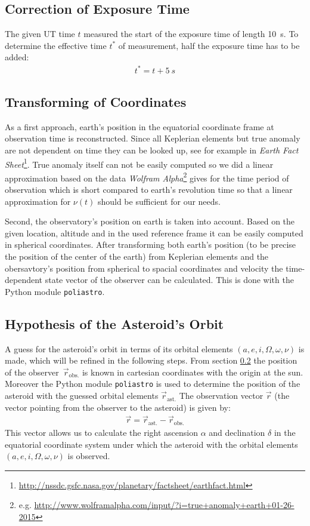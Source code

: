 \documentclass[11pt, a4paper]{article}
\numberwithin{equation}{section}
\begin{document}
\subsection{Correction of Exposure Time}
The given UT time $t$ measured the start of the exposure time of length \SI{10}{s}.
To determine the effective time $t^*$ of measurement, half the exposure time has to be added:
\begin{align}
	t^* = t + \SI{5}{s}
\end{align}

\subsection{Transforming of Coordinates}
\label{sec:cstransform}
As a first approach, earth's position in the equatorial coordinate frame at observation time is reconstructed.
Since all Keplerian elements but true anomaly are not dependent on time they can be looked up, see for example in \emph{Earth Fact Sheet}\footnote{\url{http://nssdc.gsfc.nasa.gov/planetary/factsheet/earthfact.html}}.
True anomaly itself can not be easily computed so we did a linear approximation based on the data \emph{Wolfram Alpha}\footnote{e.g. \url{http://www.wolframalpha.com/input/?i=true+anomaly+earth+01-26-2015}} gives for the time period of observation which is short compared to earth's revolution time so that a linear approximation for $\nu(t)$ should be sufficient for our needs.

Second, the observatory's position on earth is taken into account.
Based on the given location, altitude and in the used reference frame it can be easily computed in spherical coordinates.
After transforming both earth's position (to be precise the position of the center of the earth) from Keplerian elements and the obersavtory's position from spherical to spacial coordinates and velocity the time-dependent state vector of the observer can be calculated.
This is done with the Python module \texttt{poliastro}.

\subsection{Hypothesis of the Asteroid's Orbit}
\label{sec:hypothesis}
A guess for the asteroid's orbit in terms of its orbital elements $(a, e, i, \Omega, \omega, \nu)$ is made, which will be refined in the following steps.
From section \ref{sec:cstransform} the position of the observer~$\vec{r}_\mathrm{obs.}$ is known in cartesian coordinates with the origin at the sun.
Moreover the Python module \texttt{poliastro} is used to determine the position of the asteroid with the guessed orbital elements $\vec{r}_\mathrm{ast.}$
The observation vector $\vec{r}$ (the vector pointing from the observer to the asteroid) is given by:
\begin{align}
	\vec{r} = \vec{r}_\mathrm{ast.} - \vec{r}_\mathrm{obs.}
\end{align}
This vector allows us to calculate the right ascension $\alpha$ and declination $\delta$ in the equatorial coordinate system under which the asteroid with the orbital elements $(a, e, i, \Omega, \omega, \nu)$ is observed.
\end{document}
